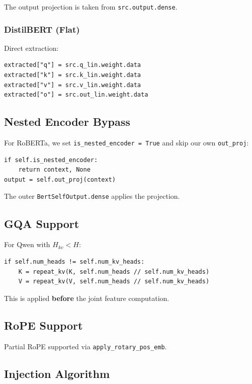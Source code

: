 The output projection is taken from \texttt{src.output.dense}.

\subsubsection{DistilBERT (Flat)}

Direct extraction:

\begin{lstlisting}
extracted["q"] = src.q_lin.weight.data
extracted["k"] = src.k_lin.weight.data
extracted["v"] = src.v_lin.weight.data
extracted["o"] = src.out_lin.weight.data
\end{lstlisting}

\subsection{Nested Encoder Bypass}

For RoBERTa, we set \texttt{is\_nested\_encoder = True} and skip our own \texttt{out\_proj}:

\begin{lstlisting}
if self.is_nested_encoder:
    return context, None
output = self.out_proj(context)
\end{lstlisting}

The outer \texttt{BertSelfOutput.dense} applies the projection.

\subsection{GQA Support}

For Qwen with $H_{kv} < H$:

\begin{lstlisting}
if self.num_heads != self.num_kv_heads:
    K = repeat_kv(K, self.num_heads // self.num_kv_heads)
    V = repeat_kv(V, self.num_heads // self.num_kv_heads)
\end{lstlisting}

This is applied \textbf{before} the joint feature computation.

\subsection{RoPE Support}

Partial RoPE supported via \texttt{apply\_rotary\_pos\_emb}.

\subsection{Injection Algorithm}

